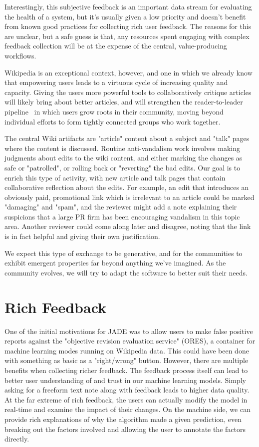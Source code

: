 \documentclass{sigchi-ext}
\begin{document}
Interestingly, this subjective feedback is an important data stream for evaluating the health of a system, but it's usually given a low priority and doesn't benefit from known good practices for collecting rich user feedback.  The reasons for this are unclear, but a safe guess is that, any resources spent engaging with complex feedback collection will be at the expense of the central, value-producing workflows.

Wikipedia is an exceptional context, however, and one in which we already know that empowering users leads to a virtuous cycle of increasing quality and capacity.  Giving the users more powerful tools to collaboratively critique articles will likely bring about better articles, and will strengthen the reader-to-leader pipeline~\cite{preece2009reader} in which users grow roots in their community, moving beyond individual efforts to form tightly connected groups who work together.

The central Wiki artifacts are "article" content about a subject and "talk" pages where the content is discussed.  Routine anti-vandalism work involves making judgments about edits to the wiki content, and either marking the changes as safe or "patrolled", or rolling back or "reverting" the bad edits.  Our goal is to enrich this type of activity, with new article and talk pages that contain collaborative reflection about the edits.  For example, an edit that introduces an obviously paid, promotional link which is irrelevant to an article could be marked "damaging" and "spam", and the reviewer might add a note explaining their suspicions that a large PR firm has been encouraging vandalism in this topic area.  Another reviewer could come along later and disagree, noting that the link is in fact helpful and giving their own justification.

We expect this type of exchange to be generative, and for the communities to exhibit emergent properties far beyond anything we've imagined.  As the community evolves, we will try to adapt the software to better suit their needs.

\section{Rich Feedback}

One of the initial motivations for JADE was to allow users to make false positive reports against the "objective revision evaluation service" (ORES), a container for machine learning modes running on Wikipedia data.  This could have been done with something as basic as a "right/wrong" button.  However, there are multiple benefits when collecting richer feedback.  The feedback process itself can lead to better user understanding of and trust in our machine learning models.  Simply asking for a freeform text note along with feedback leads to higher data quality.  At the far extreme of rich feedback, the users can actually modify the model in real-time and examine the impact of their changes.\cite{amershi2014power} \cite{stumpf2009interacting}  On the machine side, we can provide rich explanations of why the algorithm made a given prediction, even breaking out the factors involved and allowing the user to annotate the factors directly.
\end{document}
